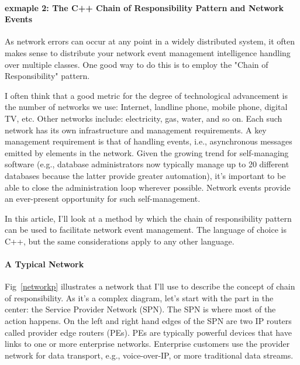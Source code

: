 \documentclass{book}
\begin{document}
\paragraph{exmaple 2: The C++ Chain of Responsibility Pattern and Network Events}
As network errors can occur at any point in a widely distributed system, it often makes sense to distribute your network event management intelligence handling over multiple classes.
One good way to do this is to employ the "Chain of Responsibility" pattern. 

I often think that a good metric for the degree of technological advancement is the number of networks we use: Internet, landline phone, mobile phone, digital TV, etc.
Other networks include: electricity, gas, water, and so on. Each such network has its own infrastructure and management requirements.
A key management requirement is that of handling events, i.e., asynchronous messages emitted by elements in the network.
Given the growing trend for self-managing software (e.g., database administrators now typically manage up to 20 different databases because the latter provide greater automation),
it's important to be able to close the administration loop wherever possible. Network events provide an ever-present opportunity for such self-management.

In this article, I'll look at a method by which the chain of responsibility pattern can be used to facilitate network event management.
The language of choice is C++, but the same considerations apply to any other language.


\begin{figure}[H]
\begin{floatrow}
\end{floatrow}
\end{figure}

\paragraph{A Typical Network}

Fig~\ref{networkp} illustrates a network that I'll use to describe the concept of chain of responsibility. 
As it's a complex diagram, let's start with the part in the center: the Service Provider Network (SPN).
The SPN is where most of the action happens. On the left and right hand edges of the SPN are two IP routers called provider edge routers (PEs).
PEs are typically powerful devices that have links to one or more enterprise networks. Enterprise customers use the provider network for data transport, e.g., voice-over-IP,
or more traditional data streams. 
\end{document}
